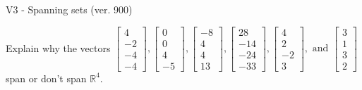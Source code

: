 \begin{exercise}
  \begin{exerciseTitle}V3 - Spanning sets (ver. 900)\end{exerciseTitle}
  \begin{exerciseStatement}
    Explain why the vectors \(\left[\begin{array}{r}
4 \\
-2 \\
-4 \\
-4
\end{array}\right] , \left[\begin{array}{r}
0 \\
0 \\
4 \\
-5
\end{array}\right] , \left[\begin{array}{r}
-8 \\
4 \\
4 \\
13
\end{array}\right] , \left[\begin{array}{r}
28 \\
-14 \\
-24 \\
-33
\end{array}\right] , \left[\begin{array}{r}
4 \\
2 \\
-2 \\
3
\end{array}\right] , \text{ and } \left[\begin{array}{r}
3 \\
1 \\
3 \\
2
\end{array}\right]\) span or don't span \(\mathbb{R}^4\). 
	



\end{exerciseStatement}
\end{exercise}
